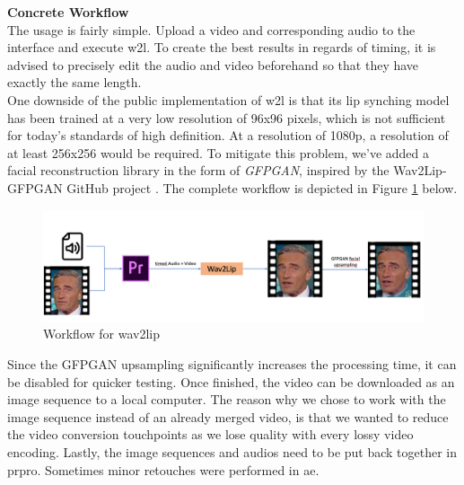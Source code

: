 \documentclass[
  a4paper,  %
  twoside,  %
  bibliography=totoc,
  headsepline,
  cleardoublepage=empty,
  parskip=half,
  draft=false
]{scrbook}
\begin{document}
\textbf{Concrete Workflow} \\
The usage is fairly simple. Upload a video and corresponding audio to the interface and execute \gls{w2l}. To create the best results in regards of timing, it is advised to precisely edit the audio and video beforehand so that they have exactly the same length. \\
One downside of the public implementation of \gls{w2l} is that its lip synching model has been trained at a very low resolution of 96x96 pixels, which is not sufficient for today's standards of high definition. At a resolution of 1080p, a resolution of at least 256x256 would be required. To mitigate this problem, we've added a facial reconstruction library in the form of \textit{GFPGAN}, inspired by the Wav2Lip-GFPGAN GitHub project \cite{sainyAjaysainyWav2LipGFPGAN2023}.
The complete workflow is depicted in Figure \ref{fig:w2l workflow} below.
\begin{figure}[h]
  \centering
  \includegraphics[width=1\textwidth]{./graphics/images/wav2lip/w2l workflow.png}
  \caption{Workflow for wav2lip}
  \label{fig:w2l workflow}
\end{figure}
Since the GFPGAN upsampling significantly increases the processing time, it can be disabled for quicker testing. Once finished, the video can be downloaded as an image sequence to a local computer. The reason why we chose to work with the image sequence instead of an already merged video, is that we wanted to reduce the video conversion touchpoints as we lose quality with every lossy video encoding. Lastly, the image sequences and audios need to be put back together in \gls{prpro}. Sometimes minor retouches were performed in \gls{ae}.
\end{document}
